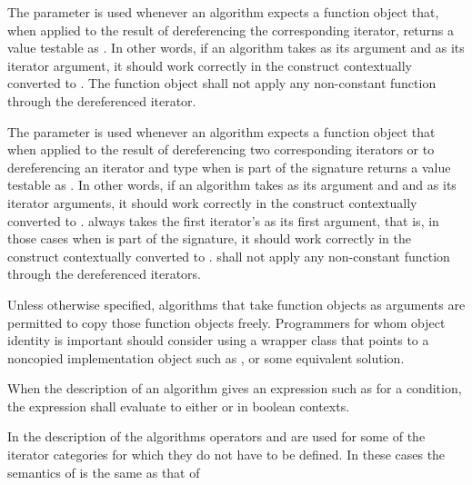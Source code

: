 \pnum
The
parameter is used whenever an algorithm expects a function object
that, when applied to the result
of dereferencing the corresponding iterator, returns a value testable as
.
In other words, if an algorithm
takes
as its argument and 
as its iterator argument, it should work correctly in the
construct
 contextually converted to .
The function object
shall not apply any non-constant
function through the dereferenced iterator.

\pnum
The
parameter is used whenever an algorithm expects a function object that when applied to
the result of dereferencing two corresponding iterators or to dereferencing an
iterator and type
when
is part of the signature returns a value testable as
.
In other words, if an algorithm takes
as its argument and  and  as
its iterator arguments, it should work correctly in
the construct
 contextually converted to .
always takes the first
iterator's 
as its first argument, that is, in those cases when
is part of the signature, it should work
correctly in the
construct  contextually converted to .
 shall not
apply any non-constant function through the dereferenced iterators.

\pnum
\begin{note}
Unless otherwise specified, algorithms that take function objects as arguments
are permitted to copy those function objects freely. Programmers for whom object
identity is important should consider using a wrapper class that points to a
noncopied implementation object such as , or some equivalent solution.
\end{note}

\pnum
When the description of an algorithm gives an expression such as
for a condition, the expression shall evaluate to
either  or  in boolean contexts.

\pnum
In the description of the algorithms operators
\tcode{+}
and
\tcode{-}
are used for some of the iterator categories for which
they do not have to be defined.
In these cases the semantics of
is the same as that of

